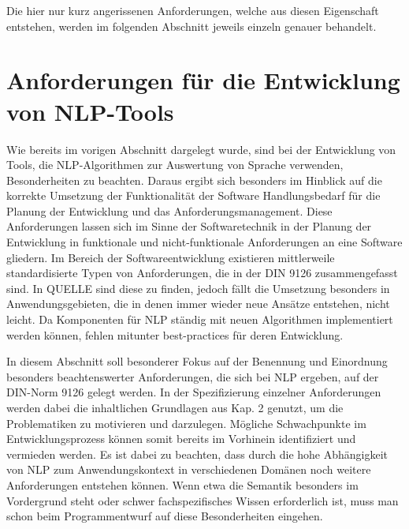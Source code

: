\documentclass[12pt]{report}
\begin{document}
Die hier nur kurz angerissenen Anforderungen, welche aus diesen Eigenschaft entstehen, werden im folgenden Abschnitt jeweils einzeln genauer behandelt.

\section{Anforderungen für die Entwicklung von NLP-Tools}
Wie bereits im vorigen Abschnitt dargelegt wurde, sind bei der Entwicklung von Tools, die NLP-Algorithmen zur Auswertung von Sprache verwenden, Besonderheiten zu beachten. Daraus ergibt sich besonders im Hinblick auf die korrekte Umsetzung der Funktionalität der Software Handlungsbedarf für die Planung der Entwicklung und das Anforderungsmanagement. Diese Anforderungen lassen sich im Sinne der Softwaretechnik in der Planung der Entwicklung in funktionale und nicht-funktionale Anforderungen an eine Software gliedern. Im Bereich der Softwareentwicklung existieren mittlerweile standardisierte Typen von Anforderungen, die in der DIN 9126 zusammengefasst sind. In QUELLE sind diese zu finden, jedoch fällt die Umsetzung besonders in Anwendungsgebieten, die in denen immer wieder neue Ansätze entstehen, nicht leicht. Da Komponenten für NLP ständig mit neuen Algorithmen implementiert werden können, fehlen mitunter best-practices für deren Entwicklung.

In diesem Abschnitt soll besonderer Fokus auf der Benennung und Einordnung besonders beachtenswerter Anforderungen, die sich bei NLP ergeben, auf der DIN-Norm 9126 gelegt werden. In der Spezifizierung einzelner Anforderungen werden dabei die inhaltlichen Grundlagen aus Kap. 2 genutzt, um die Problematiken zu motivieren und darzulegen. Mögliche Schwachpunkte im Entwicklungsprozess können somit bereits im Vorhinein identifiziert und vermieden werden. Es ist dabei zu beachten, dass durch die hohe Abhängigkeit von NLP zum Anwendungskontext in verschiedenen Domänen noch weitere Anforderungen entstehen können. Wenn etwa die Semantik besonders im Vordergrund steht oder schwer fachspezifisches Wissen erforderlich ist, muss man schon beim Programmentwurf auf diese Besonderheiten eingehen.
\end{document}

